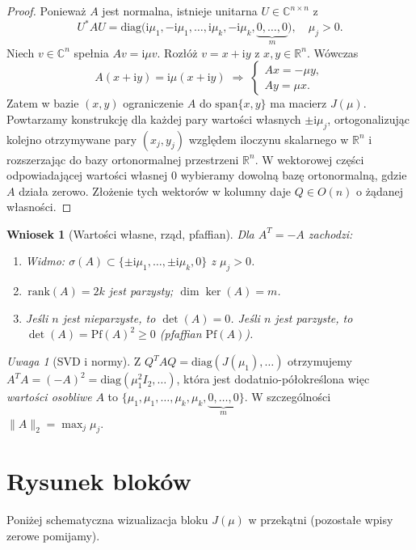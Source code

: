 \documentclass[12pt]{article}
\theoremstyle{plain}
\newtheorem{corollary}[theorem]{Wniosek}
\theoremstyle{remark}
\newtheorem*{remark}{Uwaga}
\newcommand{\R}{\mathbb{R}}
\newcommand{\C}{\mathbb{C}}
\newcommand{\ii}{\mathrm{i}}
\begin{document}
\begin{proof}
Ponieważ $A$ jest normalna, istnieje unitarna $U\in\C^{n\times n}$ z
\[
U^*AU=\mathrm{diag}\big(\ii\mu_1,-\ii\mu_1,\dots,\ii\mu_k,-\ii\mu_k,\underbrace{0,\dots,0}_{m}\big),
\quad \mu_j>0.
\]
Niech $v\in\C^n$ spełnia $Av=\ii\mu v$. Rozłóż $v=x+\ii y$ z $x,y\in\R^n$.
Wówczas
\[
A(x+\ii y)=\ii\mu(x+\ii y)\;\Longrightarrow\;
\begin{cases}
Ax=-\mu y,\\
Ay=\mu x.
\end{cases}
\]
Zatem w bazie $(x,y)$ ograniczenie $A$ do $\mathrm{span}\{x,y\}$ ma macierz $J(\mu)$.
Powtarzamy konstrukcję dla każdej pary wartości własnych $\pm\ii\mu_j$, ortogonalizując
kolejno otrzymywane pary $(x_j,y_j)$ względem iloczynu skalarnego w $\R^n$ i rozszerzając
do bazy ortonormalnej przestrzeni $\R^n$. W wektorowej części odpowiadającej wartości
własnej $0$ wybieramy dowolną bazę ortonormalną, gdzie $A$ działa zerowo. Złożenie
tych wektorów w kolumny daje $Q\in O(n)$ o żądanej własności.
\end{proof}

\begin{corollary}[Wartości własne, rząd, pfaffian]
Dla $A^T=-A$ zachodzi:
\begin{enumerate}[label=(\alph*),itemsep=2pt]
  \item Widmo: $\sigma(A)\subset \{\pm \ii \mu_1,\dots,\pm \ii \mu_k,0\}$ z $\mu_j>0$.
  \item $\,\mathrm{rank}(A)=2k$ jest parzysty; $\dim\ker(A)=m$.
  \item Jeśli $n$ jest nieparzyste, to $\det(A)=0$. Jeśli $n$ jest parzyste, to
        $\det(A)=\mathrm{Pf}(A)^2\ge 0$ (pfaffian $\mathrm{Pf}(A)$).
\end{enumerate}
\end{corollary}

\begin{remark}[SVD i normy]
Z $Q^TAQ=\mathrm{diag}(J(\mu_1),\dots)$ otrzymujemy $A^TA=(-A)^2=\mathrm{diag}(\mu_1^2 I_2,\dots)$, która jest dodatnio-półokreślona
więc \emph{wartości osobliwe} $A$ to $\{\mu_1,\mu_1,\dots,\mu_k,\mu_k,\underbrace{0,\dots,0}_{m}\}$.
W szczególności $\|A\|_2=\max_j \mu_j$.
\end{remark}

\section{Rysunek bloków}
Poniżej schematyczna wizualizacja bloku $J(\mu)$ w przekątni (pozostałe wpisy zerowe pomijamy).
\begin{center}
\end{center}
\end{document}
